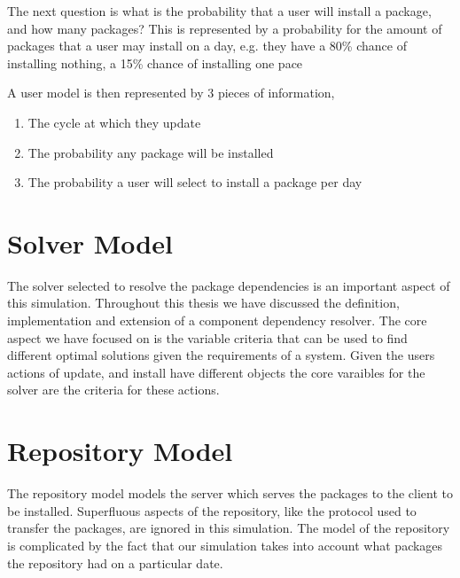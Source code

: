 The next question is what is the probability that a user will install a package, and how many packages?
This is represented by a probability for the amount of packages that a user may install on a day,
e.g. they have a 80\% chance of installing nothing, a 15\% chance of installing one pace

A user model is then represented by 3 pieces of information,
\begin{enumerate}
  \item The cycle at which they update
  \item The probability any package will be installed
  \item The probability a user will select to install a package per day
\end{enumerate}


\section{Solver Model}
The solver selected to resolve the package dependencies is an important aspect of this simulation.
Throughout this thesis we have discussed the definition, implementation and extension of a component dependency resolver.
The core aspect we have focused on is the variable criteria that can be used to find different optimal solutions given the requirements of a system.
Given the users actions of update, and install have different objects the core varaibles for the solver are the criteria for these actions.


\section{Repository Model}
{}The repository model models the server which serves the packages to the client to be installed.
{}Superfluous aspects of the repository, like the protocol used to transfer the packages, are ignored in this simulation.
{}The model of the repository is complicated by the fact that our simulation takes into account what packages the repository had on a particular date.





